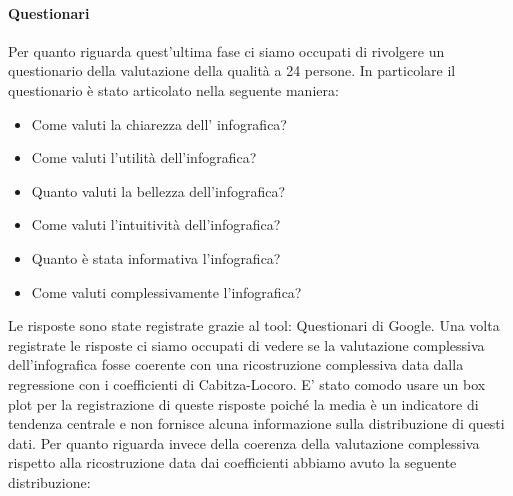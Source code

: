 \documentclass[10pt, a4paper,openany]{article}
\begin{document}
\begin{multicols}{2}
\paragraph{Questionari} Per quanto riguarda quest'ultima fase ci siamo occupati di rivolgere un questionario della valutazione della qualità a 24 persone. In particolare il questionario è stato articolato nella seguente maniera:
\begin{itemize}
	\item Come valuti la chiarezza dell' infografica?
	\item Come valuti l'utilità dell'infografica?
	\item Quanto valuti la bellezza dell'infografica?
	\item Come valuti l'intuitività dell'infografica?
	\item Quanto è stata informativa l'infografica?
	\item Come valuti complessivamente l'infografica?
\end{itemize}
Le risposte sono state registrate grazie al tool: Questionari di Google. Una volta registrate le risposte ci siamo occupati di vedere se la valutazione complessiva dell'infografica fosse coerente con una ricostruzione complessiva data dalla regressione con i coefficienti di Cabitza-Locoro.
E' stato comodo usare un box plot per la registrazione di queste risposte poiché la media è un indicatore di tendenza centrale e non fornisce alcuna informazione sulla distribuzione di questi dati.
Per quanto riguarda invece della coerenza della valutazione complessiva rispetto alla ricostruzione data dai coefficienti abbiamo avuto la seguente distribuzione:
\end{multicols}
\end{document}
